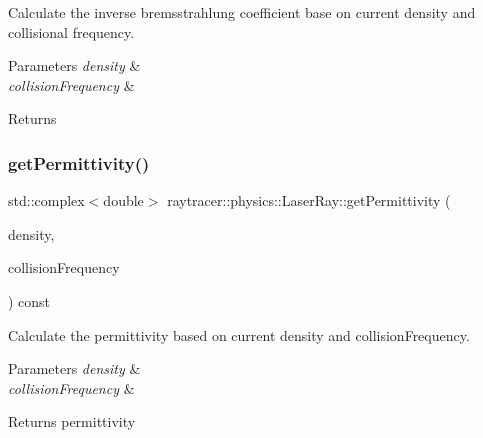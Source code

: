 Calculate the inverse bremsstrahlung coefficient base on current density and collisional frequency. 


\begin{DoxyParams}{Parameters}
{\em density} & \\
\hline
{\em collision\+Frequency} & \\
\hline
\end{DoxyParams}
\begin{DoxyReturn}{Returns}

\end{DoxyReturn}
\mbox{\label{structraytracer_1_1physics_1_1LaserRay_a2a033aeed48df8c008c221545e7a93a2}} 
\subsubsection{\texorpdfstring{get\+Permittivity()}{getPermittivity()}}
{\footnotesize\ttfamily std\+::complex$<$double$>$ raytracer\+::physics\+::\+Laser\+Ray\+::get\+Permittivity (\begin{DoxyParamCaption}\item[{const \hyperlink{structraytracer_1_1physics_1_1Density}{Density} \&}]{density,  }\item[{const \hyperlink{structraytracer_1_1physics_1_1Frequency}{Frequency} \&}]{collision\+Frequency }\end{DoxyParamCaption}) const\hspace{0.3cm}{\ttfamily [inline]}}



Calculate the permittivity based on current density and collision\+Frequency. 


\begin{DoxyParams}{Parameters}
{\em density} & \\
\hline
{\em collision\+Frequency} & \\
\hline
\end{DoxyParams}
\begin{DoxyReturn}{Returns}
permittivity 
\end{DoxyReturn}
\mbox{\label{structraytracer_1_1physics_1_1LaserRay_ae17f1eba8f0f91cb5960a865aacb9849}} 
